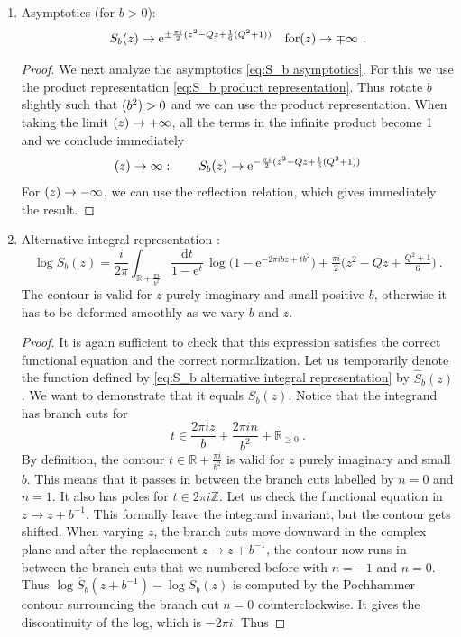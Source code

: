 \documentclass[12pt,a4paper]{article}
\newcommand{\be}{\begin{equation}}
\newcommand{\ee}{\end{equation}}
\newcommand\ZZ{\mathbb{Z}}
\newcommand\RR{\mathbb{R}}
\let\Im\relax
\DeclareMathOperator\Im{Im}
\begin{document}
\begin{enumerate}
\begin{proof}
\begin{align}
\end{align}
where we used
\be 
\frac{\vartheta_3(\tau)}{\eta(\tau)}=\mathrm{e}^{-\frac{\pi i \tau }{12}}\prod_{n=0}^\infty (1+\mathrm{e}^{2\pi i(n+\frac{1}{2})\tau})^2
\ee
and the S-modular transformation of $\vartheta_3(\tau)$ and $\eta(\tau)$. This shows that $S_b(z)=\hat{S}_b(z)$.
    \end{proof}
    \item Asymptotics (for $b>0$):
    \be 
        S_b(z) \to \mathrm{e}^{\pm \frac{\pi i}{2}(z^2-Qz+\frac{1}{6}(Q^2+1))} \quad\text{for} \Im(z) \to \mp \infty\ . \label{eq:S_b asymptotics}
    \ee
    \begin{proof}
        We next analyze the asymptotics \eqref{eq:S_b asymptotics}. For this we use the product representation \eqref{eq:S_b product representation}. Thus rotate $b$ slightly such that $\Im(b^2)>0$ and we can use the product representation. When taking the limit $\Im(z) \to +\infty$, all the terms in the infinite product become 1 and we conclude immediately
\be 
\Im(z) \to \infty:\qquad S_b(z) \to \mathrm{e}^{-\frac{\pi i}{2}(z^2-Qz+\frac{1}{6}(Q^2+1))}
\ee
For $\Im(z) \to -\infty$, we can use the reflection relation, which gives immediately the result. 
    \end{proof}
    \item Alternative integral representation \cite{Woronowicz}:
    \be 
        \log S_b(z)=\frac{i}{2\pi} \int_{\RR+\frac{\pi i}{b^2}} \frac{\mathrm{d}t}{1-\mathrm{e}^t}\, \log \big(1-\mathrm{e}^{-2\pi i b z+t b^2}\big)+\tfrac{\pi i}{2}\big(z^2-Qz+\tfrac{Q^2+1}{6}\big)\ .  \label{eq:S_b alternative integral representation}
    \ee
    The contour is valid for $z$ purely imaginary and small positive $b$, otherwise it has to be deformed smoothly as we vary $b$ and $z$.
    \begin{proof}
        It is again sufficient to check that this expression satisfies the correct functional equation and the correct normalization. Let us temporarily denote the function defined by \eqref{eq:S_b alternative integral representation} by $\hat{S}_b(z)$. We want to demonstrate that it equals $S_b(z)$. Notice that the integrand has branch cuts for
\be 
t \in \frac{2\pi i z}{b}+\frac{2\pi i n}{b^2}+\RR_{\ge 0}\ .
\ee
By definition, the contour $t \in \RR+\frac{\pi i}{b^2}$ is valid for $z$ purely imaginary and small $b$. This means that it passes in between the branch cuts labelled by $n=0$ and $n=1$.
It also has poles for $t \in 2\pi i \ZZ$. Let us check the functional equation in $z \to z+b^{-1}$. This formally leave the integrand invariant, but the contour gets shifted. When varying $z$, the branch cuts move downward in the complex plane and after the replacement $z \to z+b^{-1}$, the contour now runs in between the branch cuts that we numbered before with $n=-1$ and $n=0$. Thus $\log \hat{S}_b(z+b^{-1}) -\log \hat{S}_b(z)$ is computed by the Pochhammer contour surrounding the branch cut $n=0$ counterclockwise. It gives the discontinuity of the log, which is $-2\pi i$. Thus

\end{proof}
\end{enumerate}
\end{document}
